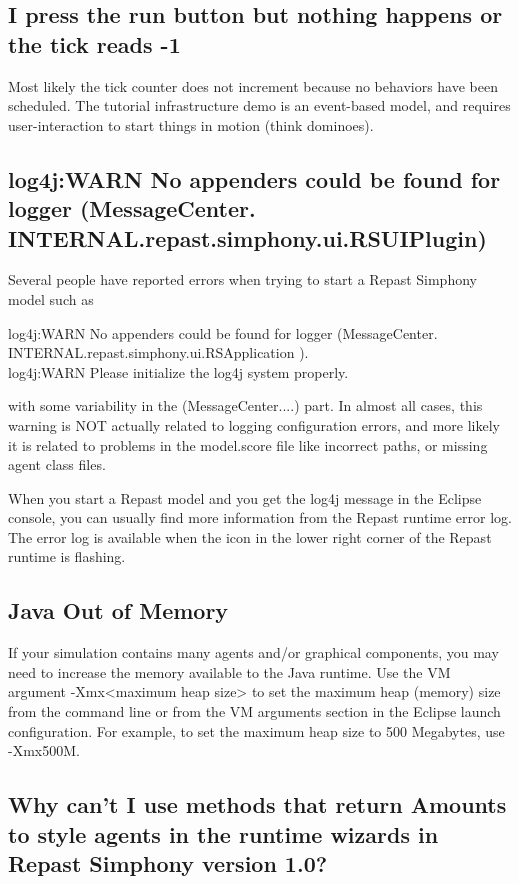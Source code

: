 \documentclass[11pt]{article}
\begin{document}
\subsection{I press the run button but nothing happens or the tick reads -1}
\label{p:run}
Most likely the tick counter does not increment because no behaviors have been scheduled. The tutorial infrastructure demo is an event-based model, and requires user-interaction to start things in motion (think dominoes).

\subsection{log4j:WARN No appenders could be found for logger (MessageCenter.\\INTERNAL.repast.simphony.ui.RSUIPlugin)}
\label{p:log4j}
Several people have reported errors when trying to start a Repast Simphony model such as

log4j:WARN No appenders could be found for logger (MessageCenter.\\INTERNAL.repast.simphony.ui.RSApplication ).\\
log4j:WARN Please initialize the log4j system properly.

with some variability in the (MessageCenter....) part. In almost all cases, this warning is NOT actually related to logging configuration errors, and more likely it is related to problems in the model.score file like incorrect paths, or missing agent class files.

When you start a Repast model and you get the log4j message in the Eclipse console, you can usually find more information from the Repast runtime error log. The error log is available when the icon in the lower right corner of the Repast runtime is flashing.

\subsection{Java Out of Memory}
\label{p:mem}

If your simulation contains many agents and/or graphical components, you may need to increase the memory available to the Java runtime. Use the VM argument -Xmx<maximum heap size> to set the maximum heap (memory) size from the command line or from the VM arguments section in the Eclipse launch configuration. For example, to set the maximum heap size to 500 Megabytes, use -Xmx500M.

\subsection{Why can't I use methods that return Amounts to style agents in the runtime wizards in Repast Simphony version 1.0?}
\label{p:amts}
\end{document}
